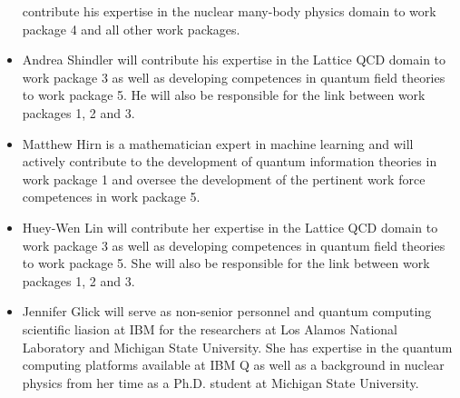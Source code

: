 \documentclass[10pt]{article}
\begin{document}
\begin{itemize}
contribute his expertise in the nuclear many-body physics domain to work package  4 and all other work packages.
\item Andrea Shindler will
contribute his expertise in the Lattice QCD domain to work package  3 as well as developing competences in quantum field theories to  work package 5. He will also be responsible for the link between work packages 1, 2 and 3. 
\item Matthew Hirn is a mathematician expert in machine learning and will actively contribute to the development of quantum information theories in work package 1 and oversee the development of the pertinent work force competences in work package 5.
\item Huey-Wen Lin will
contribute her expertise in the Lattice QCD domain to work package  3 as well as developing competences in quantum field theories to  work package 5. She will also be responsible for the link between work packages 1, 2 and 3. 

\item Jennifer Glick will serve as non-senior personnel and quantum computing scientific liasion at IBM for the researchers at Los Alamos National Laboratory and Michigan State University.  She has expertise in the quantum computing platforms available at IBM Q as well as a background in nuclear physics from her time as a Ph.D. student at Michigan State University.

\end{itemize}
\end{document}

